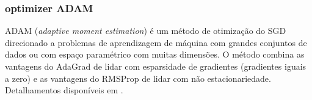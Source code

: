 \documentclass{automatextcc}
\begin{document}



\subsubsection{optimizer ADAM}
ADAM (\textit{adaptive moment estimation}) é um método de otimização do SGD direcionado a problemas de aprendizagem de máquina com grandes conjuntos de dados ou com espaço paramétrico com muitas dimensões. O método combina as vantagens do AdaGrad \citep{duchi2011} de lidar com esparsidade de gradientes (gradientes iguais a zero) e as vantagens do RMSProp \citep{tieleman2012} de lidar com não estacionariedade. Detalhamentos disponíveis em \citet{kingma2014}.



\end{document}
